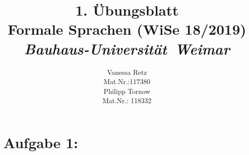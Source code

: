 \documentclass[11pt]{article}
\theoremstyle{definition}
\theoremstyle{remark}
\begin{document}
    \title{1. Übungsblatt\\
    Formale Sprachen (WiSe 18/2019)\\
    \textit{Bauhaus-Universität\ Weimar\\}
    }
    \author{Vanessa Retz\\
    \vspace{5mm}
    \normalsize Mat.Nr.:117380\\
    \large Philipp Tornow\\
    \vspace {5mm}
    \normalsize Mat.Nr.: 118332\\
    }

    \maketitle

    \newpage
    \section*{Aufgabe 1:}
\end{document}
